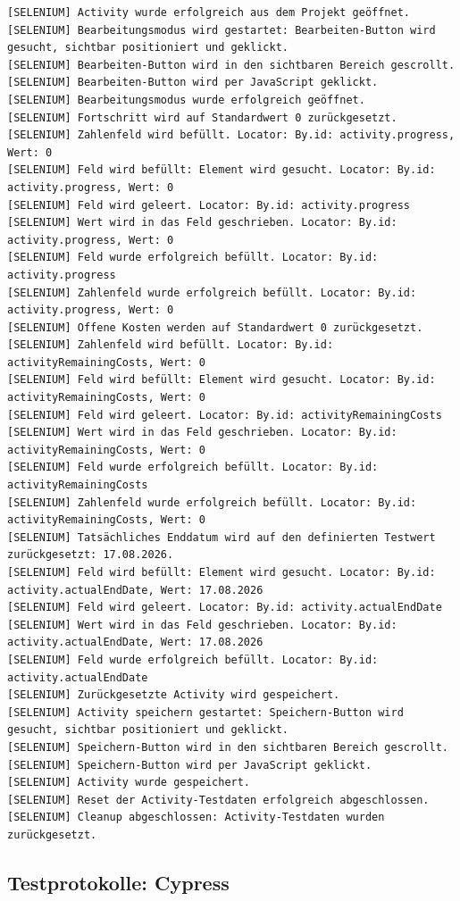 \begin{lstlisting}[caption={Selenium -- Kontrolllauf Activity bearbeiten (Erfolgreich)}, label={lst:sel_ctrl_act_ok}, style=logStyle]
[SELENIUM] Activity wurde erfolgreich aus dem Projekt geöffnet.
[SELENIUM] Bearbeitungsmodus wird gestartet: Bearbeiten-Button wird gesucht, sichtbar positioniert und geklickt.
[SELENIUM] Bearbeiten-Button wird in den sichtbaren Bereich gescrollt.
[SELENIUM] Bearbeiten-Button wird per JavaScript geklickt.
[SELENIUM] Bearbeitungsmodus wurde erfolgreich geöffnet.
[SELENIUM] Fortschritt wird auf Standardwert 0 zurückgesetzt.
[SELENIUM] Zahlenfeld wird befüllt. Locator: By.id: activity.progress, Wert: 0
[SELENIUM] Feld wird befüllt: Element wird gesucht. Locator: By.id: activity.progress, Wert: 0
[SELENIUM] Feld wird geleert. Locator: By.id: activity.progress
[SELENIUM] Wert wird in das Feld geschrieben. Locator: By.id: activity.progress, Wert: 0
[SELENIUM] Feld wurde erfolgreich befüllt. Locator: By.id: activity.progress
[SELENIUM] Zahlenfeld wurde erfolgreich befüllt. Locator: By.id: activity.progress, Wert: 0
[SELENIUM] Offene Kosten werden auf Standardwert 0 zurückgesetzt.
[SELENIUM] Zahlenfeld wird befüllt. Locator: By.id: activityRemainingCosts, Wert: 0
[SELENIUM] Feld wird befüllt: Element wird gesucht. Locator: By.id: activityRemainingCosts, Wert: 0
[SELENIUM] Feld wird geleert. Locator: By.id: activityRemainingCosts
[SELENIUM] Wert wird in das Feld geschrieben. Locator: By.id: activityRemainingCosts, Wert: 0
[SELENIUM] Feld wurde erfolgreich befüllt. Locator: By.id: activityRemainingCosts
[SELENIUM] Zahlenfeld wurde erfolgreich befüllt. Locator: By.id: activityRemainingCosts, Wert: 0
[SELENIUM] Tatsächliches Enddatum wird auf den definierten Testwert zurückgesetzt: 17.08.2026.
[SELENIUM] Feld wird befüllt: Element wird gesucht. Locator: By.id: activity.actualEndDate, Wert: 17.08.2026
[SELENIUM] Feld wird geleert. Locator: By.id: activity.actualEndDate
[SELENIUM] Wert wird in das Feld geschrieben. Locator: By.id: activity.actualEndDate, Wert: 17.08.2026
[SELENIUM] Feld wurde erfolgreich befüllt. Locator: By.id: activity.actualEndDate
[SELENIUM] Zurückgesetzte Activity wird gespeichert.
[SELENIUM] Activity speichern gestartet: Speichern-Button wird gesucht, sichtbar positioniert und geklickt.
[SELENIUM] Speichern-Button wird in den sichtbaren Bereich gescrollt.
[SELENIUM] Speichern-Button wird per JavaScript geklickt.
[SELENIUM] Activity wurde gespeichert.
[SELENIUM] Reset der Activity-Testdaten erfolgreich abgeschlossen.
[SELENIUM] Cleanup abgeschlossen: Activity-Testdaten wurden zurückgesetzt.
\end{lstlisting}

\clearpage
\subsection{Testprotokolle: Cypress}
\label{subsec:testlogs_cypress}

